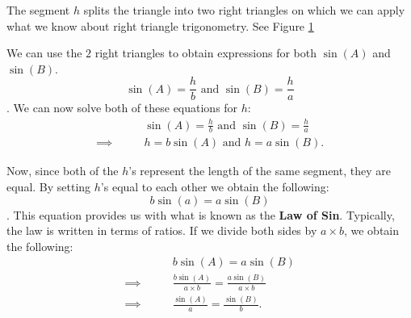 The segment $h$ splits the triangle into two right triangles on which we can
apply what we know about right triangle trigonometry. See Figure
\ref{fig:non_right_triangle_split_into_two_right_triangles_1}

\begin{figure}[htpb]
	\centering


	\caption{}
	\label{fig:non_right_triangle_split_into_two_right_triangles_1}
\end{figure}

We can use the $2$ right triangles to obtain expressions for both $\sin (A)$ and
$\sin (B)$.
\[ \sin (A) = \frac{h}{b} \textrm{ and } \sin (B) = \frac{h}{a} \].
We can now solve both of these equations for $h$:
\begin{align*}
	\qquad         & \sin (A) = \frac{h}{b} \textrm{ and } \sin (B) = \frac{h}{a} \\
	\implies\qquad & h = b\sin(A) \textrm{ and } h = a\sin (B)
	.\end{align*}

Now, since both of the $h$'s represent the length of the same segment, they are
equal. By setting $h$'s equal to each other we obtain the following:
\[ b\sin (a) = a\sin (B) \].
This equation provides us with what is known as the \textbf{Law of Sin}.
Typically, the law is written in terms of ratios. If we divide both sides by
$a \times b$, we obtain the following:
\begin{align*}
	\qquad         & b\sin (A) = a\sin (B)                                       \\
	\implies\qquad & \frac{b\sin (A)}{a \times b} = \frac{a\sin (B)}{a \times b} \\
	\implies\qquad & \frac{\sin (A)}{a} = \frac{\sin (B)}{b}
	.\end{align*}

